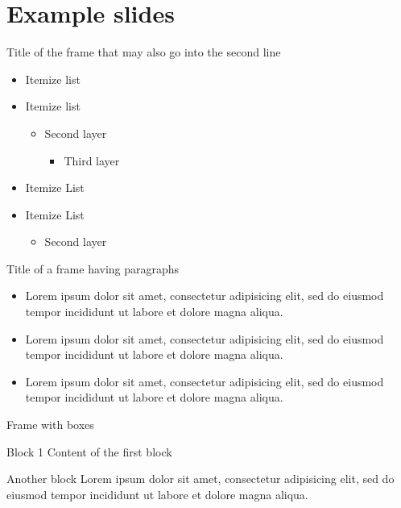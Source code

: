 \documentclass[10pt, aspectratio=1610]{beamer}
\begin{document}
\lastpage
\appendix
\section{Example slides}

\begin{frame}{Title of the frame that may also go into the second line}
	\begin{itemize}
		\item Itemize list 
		\item Itemize list
			\begin{itemize}
				\item Second layer 
					\begin{itemize}
						\item Third layer 
					\end{itemize}
			\end{itemize}
		\item Itemize List 
		\item Itemize List 
			\begin{itemize}
				\item Second layer
			\end{itemize}
	\end{itemize}
\end{frame}

\begin{frame}{Title of a frame having paragraphs}
	\begin{itemize}
		\item Lorem ipsum dolor sit amet, consectetur adipisicing elit, sed do eiusmod tempor incididunt ut labore et dolore magna aliqua.
		\item Lorem ipsum dolor sit amet, consectetur adipisicing elit, sed do eiusmod tempor incididunt ut labore et dolore magna aliqua.
		\item Lorem ipsum dolor sit amet, consectetur adipisicing elit, sed do eiusmod tempor incididunt ut labore et dolore magna aliqua.
	\end{itemize}
\end{frame}

\begin{frame}{Frame with boxes}
	\begin{block}{Block 1}
		Content of the first block
	\end{block}
	\begin{block}{Another block}
		Lorem ipsum dolor sit amet, consectetur adipisicing elit, sed do eiusmod tempor incididunt ut labore et dolore magna aliqua.
	\end{block}
\end{frame}
\end{document}
